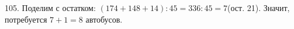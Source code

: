 105. Поделим с остатком: $(174+148+14):45=336:45=7$(ост. 21). Значит, потребуется $7+1=8$ автобусов.\\
